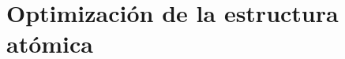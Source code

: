 \begin{comment}

\begin{equation}
\end{equation}


\subsection{Pseudo-orbitales}

Los pseudo-orbitales se escriben en términos de funciones de onda 
radiales de Laguerre no-ortogonales de la forma
\begin{equation}
P_{nl}(r) = N_{nl}(\lambda_{nl}Zr)^{l+1} e^{-\lambda_{nl}Zr/2} 
L_{n+l}^{2l+1}(\lambda_{nl}Zr)\,.
\label{eq:pseudo}
\end{equation}
\end{comment}

\section{Optimización de la estructura atómica}
\label{sec:optproblems}

